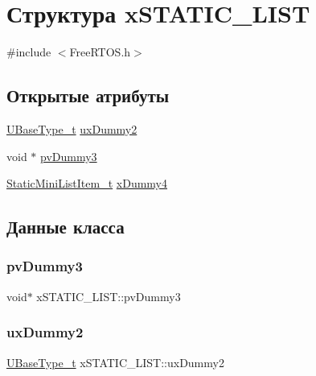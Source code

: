\hypertarget{structx_s_t_a_t_i_c___l_i_s_t}{}\section{Структура x\+S\+T\+A\+T\+I\+C\+\_\+\+L\+I\+ST}
\label{structx_s_t_a_t_i_c___l_i_s_t}


{\ttfamily \#include $<$Free\+R\+T\+O\+S.\+h$>$}

\subsection*{Открытые атрибуты}
\begin{DoxyCompactItemize}
\item 
\mbox{\hyperlink{portmacro_8h_a646f89d4298e4f5afd522202b11cb2e6}{U\+Base\+Type\+\_\+t}} \mbox{\hyperlink{structx_s_t_a_t_i_c___l_i_s_t_aa0522bc6ec8c956a9177ed9cb0e6d19f}{ux\+Dummy2}}
\item 
void $\ast$ \mbox{\hyperlink{structx_s_t_a_t_i_c___l_i_s_t_aee46aef7379c7a341ec5a3e70d6dc85f}{pv\+Dummy3}}
\item 
\mbox{\hyperlink{_free_r_t_o_s_8h_a9097f48f4dfa56e8e01d9179462c7994}{Static\+Mini\+List\+Item\+\_\+t}} \mbox{\hyperlink{structx_s_t_a_t_i_c___l_i_s_t_aafa5f9d67d7f3636f2d1f8c372e75ecf}{x\+Dummy4}}
\end{DoxyCompactItemize}


\subsection{Данные класса}
\mbox{\label{structx_s_t_a_t_i_c___l_i_s_t_aee46aef7379c7a341ec5a3e70d6dc85f}} 
\subsubsection{\texorpdfstring{pvDummy3}{pvDummy3}}
{\footnotesize\ttfamily void$\ast$ x\+S\+T\+A\+T\+I\+C\+\_\+\+L\+I\+S\+T\+::pv\+Dummy3}

\mbox{\label{structx_s_t_a_t_i_c___l_i_s_t_aa0522bc6ec8c956a9177ed9cb0e6d19f}} 
\subsubsection{\texorpdfstring{uxDummy2}{uxDummy2}}
{\footnotesize\ttfamily \mbox{\hyperlink{portmacro_8h_a646f89d4298e4f5afd522202b11cb2e6}{U\+Base\+Type\+\_\+t}} x\+S\+T\+A\+T\+I\+C\+\_\+\+L\+I\+S\+T\+::ux\+Dummy2}

